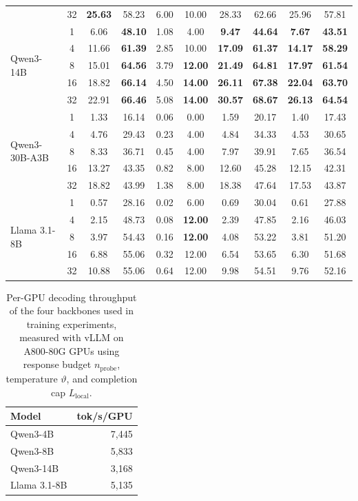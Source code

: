 \begin{table}[H]
\begin{tabular}{lccccccccc}
 & 32 & \textbf{25.63} & 58.23 & 6.00 & 10.00 & 28.33 & 62.66 & 25.96 & 57.81 \\
\cmidrule(l{3pt}r{3pt}){1-10}
\multirow{5}{*}{Qwen3-14B} & 1 & 6.06 & \textbf{48.10} & 1.08 & 4.00 & \textbf{9.47} & \textbf{44.64} & \textbf{7.67} & \textbf{43.51} \\
 & 4  & 11.66 & \textbf{61.39} & 2.85 & 10.00 & \textbf{17.09} & \textbf{61.37} & \textbf{14.17} & \textbf{58.29} \\
 & 8  & 15.01 & \textbf{64.56} & 3.79 & \textbf{12.00} & \textbf{21.49} & \textbf{64.81} & \textbf{17.97} & \textbf{61.54} \\
 & 16 & 18.82 & \textbf{66.14} & 4.50 & \textbf{14.00} & \textbf{26.11} & \textbf{67.38} & \textbf{22.04} & \textbf{63.70} \\
 & 32 & 22.91 & \textbf{66.46} & 5.08 & \textbf{14.00} & \textbf{30.57} & \textbf{68.67} & \textbf{26.13} & \textbf{64.54} \\
\cmidrule(l{3pt}r{3pt}){1-10}
\multirow{5}{*}{Qwen3-30B-A3B} & 1 & 1.33 & 16.14 & 0.06 & 0.00 & 1.59 & 20.17 & 1.40 & 17.43 \\
 & 4  & 4.76 & 29.43 & 0.23 & 4.00 & 4.84 & 34.33 & 4.53 & 30.65 \\
 & 8  & 8.33 & 36.71 & 0.45 & 4.00 & 7.97 & 39.91 & 7.65 & 36.54 \\
 & 16 & 13.27 & 43.35 & 0.82 & 8.00 & 12.60 & 45.28 & 12.15 & 42.31 \\
 & 32 & 18.82 & 43.99 & 1.38 & 8.00 & 18.38 & 47.64 & 17.53 & 43.87 \\
\cmidrule(l{3pt}r{3pt}){1-10}
\multirow{5}{*}{Llama 3.1-8B} & 1 & 0.57 & 28.16 & 0.02 & 6.00 & 0.69 & 30.04 & 0.61 & 27.88 \\
 & 4  & 2.15 & 48.73 & 0.08 & \textbf{12.00} & 2.39 & 47.85 & 2.16 & 46.03 \\
 & 8  & 3.97 & 54.43 & 0.16 & \textbf{12.00} & 4.08 & 53.22 & 3.81 & 51.20 \\
 & 16 & 6.88 & 55.06 & 0.32 & 12.00 & 6.54 & 53.65 & 6.30 & 51.68 \\
 & 32 & 10.88 & 55.06 & 0.64 & 12.00 & 9.98 & 54.51 & 9.76 & 52.16 \\
\bottomrule
\end{tabular}
\end{table}

\begin{table}[H]
\centering
\setlength{\tabcolsep}{5pt}
\caption{Per-GPU decoding throughput of the four backbones used in training
experiments, measured with vLLM on A800-80G GPUs using response budget
\(n_{\mathrm{probe}}\), temperature \(\vartheta\), and completion cap
\(L_{\mathrm{local}}\).}
\label{tab:probe-serving}
\begin{tabular}{lr}
\toprule
\rowcolor{algobg}
Model & tok/s/GPU \\
\midrule
Qwen3-4B & 7,445 \\
Qwen3-8B & 5,833 \\
Qwen3-14B & 3,168 \\
Llama 3.1-8B & 5,135 \\
\bottomrule
\end{tabular}
\end{table}

